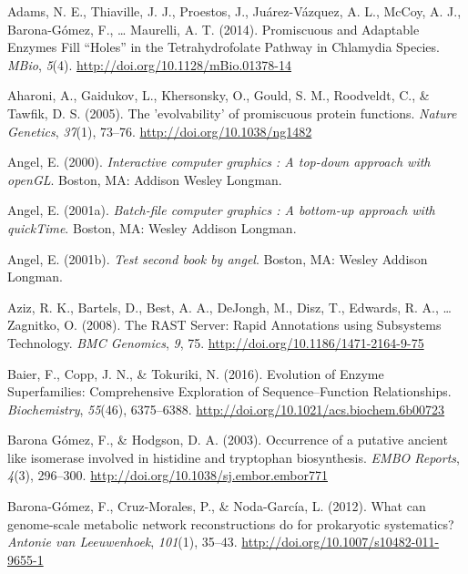 \documentclass[12pt,twoside]{reedthesis}
\begin{document}
  \hypertarget{refs}{}
  \hypertarget{ref-adamsux5fpromiscuousux5f2014}{}
  Adams, N. E., Thiaville, J. J., Proestos, J., Juárez-Vázquez, A. L.,
  McCoy, A. J., Barona-Gómez, F., \ldots{} Maurelli, A. T. (2014).
  Promiscuous and Adaptable Enzymes Fill ``Holes'' in the Tetrahydrofolate
  Pathway in Chlamydia Species. \emph{MBio}, \emph{5}(4).
  \url{http://doi.org/10.1128/mBio.01378-14}
  
  \hypertarget{ref-aharoniux5fevolvabilityux5f2005}{}
  Aharoni, A., Gaidukov, L., Khersonsky, O., Gould, S. M., Roodveldt, C.,
  \& Tawfik, D. S. (2005). The 'evolvability' of promiscuous protein
  functions. \emph{Nature Genetics}, \emph{37}(1), 73--76.
  \url{http://doi.org/10.1038/ng1482}
  
  \hypertarget{ref-angel2000}{}
  Angel, E. (2000). \emph{Interactive computer graphics : A top-down
  approach with openGL}. Boston, MA: Addison Wesley Longman.
  
  \hypertarget{ref-angel2001}{}
  Angel, E. (2001a). \emph{Batch-file computer graphics : A bottom-up
  approach with quickTime}. Boston, MA: Wesley Addison Longman.
  
  \hypertarget{ref-angel2002a}{}
  Angel, E. (2001b). \emph{Test second book by angel}. Boston, MA: Wesley
  Addison Longman.
  
  \hypertarget{ref-azizux5frastux5f2008}{}
  Aziz, R. K., Bartels, D., Best, A. A., DeJongh, M., Disz, T., Edwards,
  R. A., \ldots{} Zagnitko, O. (2008). The RAST Server: Rapid Annotations
  using Subsystems Technology. \emph{BMC Genomics}, \emph{9}, 75.
  \url{http://doi.org/10.1186/1471-2164-9-75}
  
  \hypertarget{ref-baierux5fevolutionux5f2016}{}
  Baier, F., Copp, J. N., \& Tokuriki, N. (2016). Evolution of Enzyme
  Superfamilies: Comprehensive Exploration of Sequence--Function
  Relationships. \emph{Biochemistry}, \emph{55}(46), 6375--6388.
  \url{http://doi.org/10.1021/acs.biochem.6b00723}
  
  \hypertarget{ref-baronagomezux5foccurrenceux5f2003}{}
  Barona Gómez, F., \& Hodgson, D. A. (2003). Occurrence of a putative
  ancient like isomerase involved in histidine and tryptophan
  biosynthesis. \emph{EMBO Reports}, \emph{4}(3), 296--300.
  \url{http://doi.org/10.1038/sj.embor.embor771}
  
  \hypertarget{ref-barona-gomezux5fwhatux5f2012}{}
  Barona-Gómez, F., Cruz-Morales, P., \& Noda-García, L. (2012). What can
  genome-scale metabolic network reconstructions do for prokaryotic
  systematics? \emph{Antonie van Leeuwenhoek}, \emph{101}(1), 35--43.
  \url{http://doi.org/10.1007/s10482-011-9655-1}
  
\end{document}
